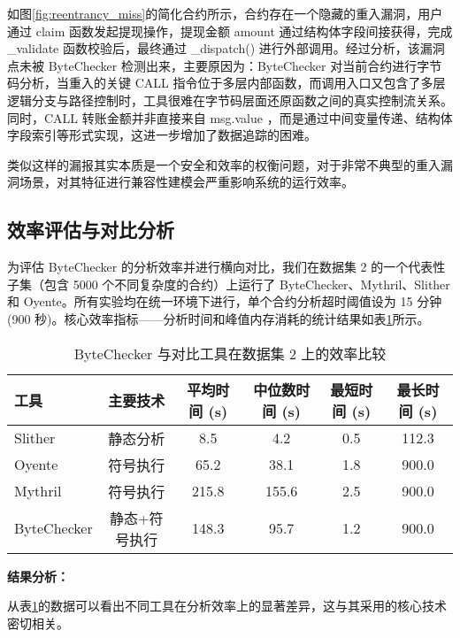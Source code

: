 \documentclass[print, master, vlined, timesmath]{DissertUESTC}
\begin{document}
如图\ref{fig:reentrancy_miss}的简化合约所示，合约存在一个隐藏的重入漏洞，用户通过 claim 函数发起提现操作，提现金额 amount 通过结构体字段间接获得，完成 \_validate 函数校验后，最终通过 \_dispatch() 进行外部调用。经过分析，该漏洞点未被 ByteChecker 检测出来，主要原因为：ByteChecker 对当前合约进行字节码分析，当重入的关键 CALL 指令位于多层内部函数，而调用入口又包含了多层逻辑分支与路径控制时，工具很难在字节码层面还原函数之间的真实控制流关系。同时，CALL 转账金额并非直接来自 msg.value ，而是通过中间变量传递、结构体字段索引等形式实现，这进一步增加了数据追踪的困难。

类似这样的漏报其实本质是一个安全和效率的权衡问题，对于非常不典型的重入漏洞场景，对其特征进行兼容性建模会严重影响系统的运行效率。


\subsection{效率评估与对比分析}

为评估 ByteChecker 的分析效率并进行横向对比，我们在数据集 2 的一个代表性子集（包含 5000 个不同复杂度的合约）上运行了 ByteChecker、Mythril、Slither 和 Oyente。所有实验均在统一环境下进行，单个合约分析超时阈值设为 15 分钟 (900 秒)。核心效率指标——分析时间和峰值内存消耗的统计结果如表\ref{tab:efficiency_comparison}所示。

\begin{table}[H]
    \centering
    \caption{ByteChecker 与对比工具在数据集 2 上的效率比较}
    \begin{tabularx}{\linewidth}{lccccc}
        \toprule
        \textbf{工具} & \textbf{主要技术} & \textbf{平均时间 (s)} & \textbf{中位数时间 (s)} & \textbf{最短时间 (s)} & \textbf{最长时间 (s)} \\
        \midrule
        Slither & 静态分析 & 8.5 & 4.2 & 0.5 & 112.3 \\
        Oyente & 符号执行  & 65.2 & 38.1 & 1.8 & 900.0  \\
        Mythril & 符号执行 & 215.8 & 155.6 & 2.5 & 900.0 \\
        ByteChecker & 静态+符号执行 & 148.3 & 95.7 & 1.2 & 900.0 \\
        \bottomrule
    \end{tabularx}
    \label{tab:efficiency_comparison}
\end{table}

\textbf{结果分析：}

从表\ref{tab:efficiency_comparison}的数据可以看出不同工具在分析效率上的显著差异，这与其采用的核心技术密切相关。
\end{document}
